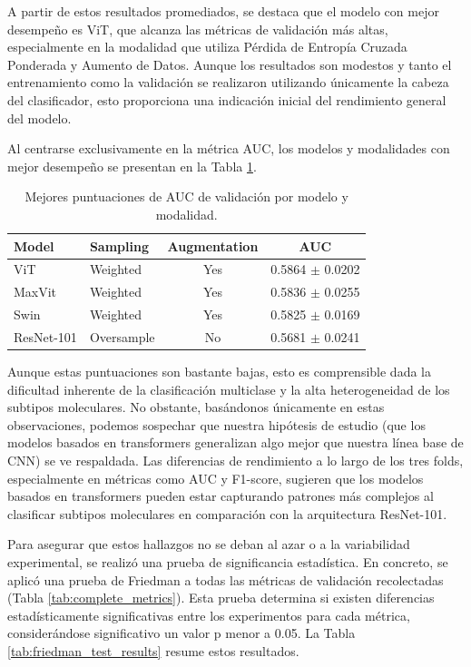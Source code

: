 \documentclass[a4paper,10pt]{book}
\begin{document}
A partir de estos resultados promediados, se destaca que el modelo con mejor desempeño es ViT, que alcanza las métricas de validación más altas, especialmente en la modalidad que utiliza Pérdida de Entropía Cruzada Ponderada y Aumento de Datos. Aunque los resultados son modestos y tanto el entrenamiento como la validación se realizaron utilizando únicamente la cabeza del clasificador, esto proporciona una indicación inicial del rendimiento general del modelo.

Al centrarse exclusivamente en la métrica AUC, los modelos y modalidades con mejor desempeño se presentan en la Tabla \ref{tab:best_auc_modalities_validation}.

\begin{table}[h!]
  \centering
\caption[Mejores puntuaciones de AUC de validación por modelo y modalidad.]{Mejores puntuaciones de AUC de validación por modelo y modalidad.}
  \label{tab:best_auc_modalities_validation}
  \begin{tabular}{l l c c}
    \toprule
    \textbf{Model} & \textbf{Sampling} & \textbf{Augmentation} & \textbf{AUC} \\ 
    \midrule
    ViT & Weighted & Yes & 0.5864  $\pm$ 0.0202   \\
    MaxVit  & Weighted & Yes  & 0.5836 $\pm$  0.0255 \\
    Swin    & Weighted & Yes  & 0.5825 $\pm$  0.0169 \\
    ResNet-101    & Oversample & No & 0.5681 $\pm$  0.0241 \\
    \bottomrule
  \end{tabular}
\end{table}


Aunque estas puntuaciones son bastante bajas, esto es comprensible dada la dificultad inherente de la clasificación multiclase y la alta heterogeneidad de los subtipos moleculares. No obstante, basándonos únicamente en estas observaciones, podemos sospechar que nuestra hipótesis de estudio (que los modelos basados en transformers generalizan algo mejor que nuestra línea base de CNN) se ve respaldada. Las diferencias de rendimiento a lo largo de los tres folds, especialmente en métricas como AUC y F1-score, sugieren que los modelos basados en transformers pueden estar capturando patrones más complejos al clasificar subtipos moleculares en comparación con la arquitectura ResNet-101.

Para asegurar que estos hallazgos no se deban al azar o a la variabilidad experimental, se realizó una prueba de significancia estadística. En concreto, se aplicó una prueba de Friedman a todas las métricas de validación recolectadas (Tabla \ref{tab:complete_metrics}). Esta prueba determina si existen diferencias estadísticamente significativas entre los experimentos para cada métrica, considerándose significativo un valor p menor a 0.05. La Tabla \ref{tab:friedman_test_results} resume estos resultados.
\end{document}
